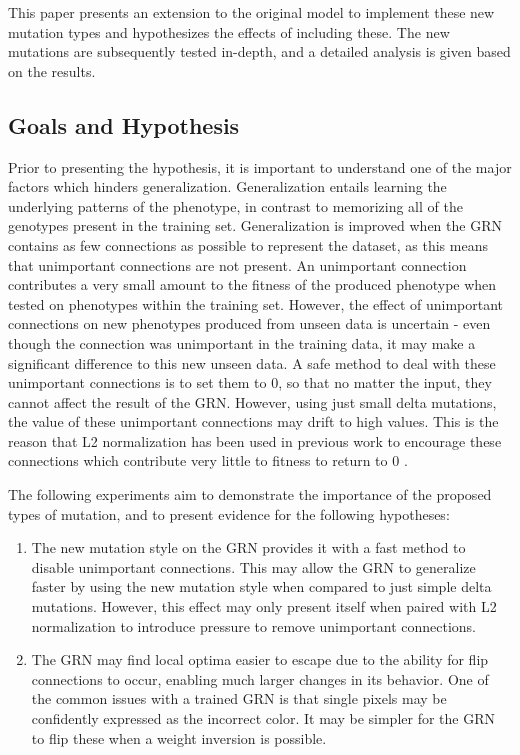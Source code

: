 \documentclass[twocolumn,a4paper,11pt]{article}
\begin{document}
    This paper presents an extension to the original model to implement these new mutation types and hypothesizes the effects of including these. The new mutations are subsequently tested in-depth, and a detailed analysis is given based on the results.

    \subsection{Goals and Hypothesis}
    Prior to presenting the hypothesis, it is important to understand one of the major factors which hinders generalization. Generalization entails learning the underlying patterns of the phenotype, in contrast to memorizing all of the genotypes present in the training set. Generalization is improved when the GRN contains as few connections as possible to represent the dataset, as this means that unimportant connections are not present. An unimportant connection contributes a very small amount to the fitness of the produced phenotype when tested on phenotypes within the training set. However, the effect of unimportant connections on new phenotypes produced from unseen data is uncertain - even though the connection was unimportant in the training data, it may make a significant difference to this new unseen data. A safe method to deal with these unimportant connections is to set them to 0, so that no matter the input, they cannot affect the result of the GRN. However, using just small delta mutations, the value of these unimportant connections may drift to high values. This is the reason that L2 normalization has been used in previous work to encourage these connections which contribute very little to fitness to return to 0 \cite{advanced-paper}.

    The following experiments aim to demonstrate the importance of the proposed types of mutation, and to present evidence for the following hypotheses:

    \begin{enumerate}
        \item The new mutation style on the GRN provides it with a fast method to disable unimportant connections. This may allow the GRN to generalize faster by using the new mutation style when compared to just simple delta mutations. However, this effect may only present itself when paired with L2 normalization to introduce pressure to remove unimportant connections.
        \item The GRN may find local optima easier to escape due to the ability for flip connections to occur, enabling much larger changes in its behavior. One of the common issues with a trained GRN is that single pixels may be confidently expressed as the incorrect color. It may be simpler for the GRN to flip these when a weight inversion is possible.
    \end{enumerate}
\end{document}
